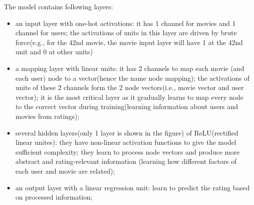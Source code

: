\documentclass{article}
\begin{document}
The model contains following layers:
\begin{itemize}
	\item an input layer with one-hot activations: it has 1 channel for movies 
	and 1 channel for users;
	the activations of units in this layer are driven by brute force(e.g., for 
	the 42nd movie, the movie input layer will have 1 at the 42nd unit and 0 at 
	other units)
	\item a mapping layer with linear units: it has 2 channels to map each 
	movie (and each user) node to a vector(hence the name node mapping);
	the activations of units of these 2 channels form the 2 node vectors(i.e., 
	movie vector and user vector);
	it is the most critical layer as it gradually learns to map every node to 
	the correct vector during training(learning information about users and 
	movies from ratings);
	\item several hidden layers(only 1 layer is shown in the figure) of 
	ReLU(rectified linear unites):
	they have non-linear activation functions to give the model sufficient 
	complexity; 
	they learn to process node vectors and produce more abstract and 
	rating-relevant information (learning how different factors of each user 
	and movie are related);
	\item an output layer with a linear regression unit: learn to predict the 
	rating based on processed information;
\end{itemize}
\end{document}
